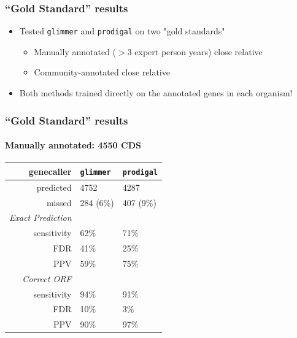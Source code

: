 \documentclass[table]{beamer}
\begin{document}
    \begin{frame}
     \frametitle{``Gold Standard'' results}
     \begin{itemize}
       \item Tested \texttt{glimmer} and \texttt{prodigal} on two "gold standards"
       \begin{itemize}
         \item Manually annotated ($>$3 expert person years) close relative
         \item Community-annotated close relative
       \end{itemize}
       \item Both methods trained directly on the annotated genes in each organism!
     \end{itemize} 
   \end{frame}

    \begin{frame}
     \frametitle{``Gold Standard'' results}
     \framesubtitle{Manually annotated: 4550 CDS}
    \begin{center}
	\begin{tabular}{r|l|l}
	  genecaller & \texttt{glimmer} & \texttt{prodigal}  \\
	  \hline
	  predicted & 4752    & 4287  \\
	  missed & 284 (6\%)   & 407 (9\%)  \\
	  \hline
	  \emph{Exact Prediction} & & \\
  	  sensitivity   & 62\%   & 71\%  \\
  	  FDR   & 41\%   & 25\%  \\  
	  PPV   & 59\% & 75\%  \\  
	  \hline
	  \emph{Correct ORF} & & \\
  	  sensitivity   & 94\%   & 91\% \\
  	  FDR   & 10\%  & 3\% \\  
	  PPV   & 90\% & 97\%  \\  
	\end{tabular}
	\end{center}     
   \end{frame}
\end{document}
